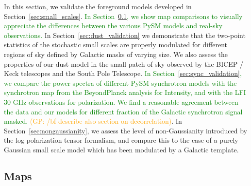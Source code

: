 \documentclass[twocolumn]{aastex631}
\newcommand{\giuse}[1]{\textcolor{orange}{(GP: #1)}}
\newcommand{\sg}[1]{\textcolor{teal}{(SG: #1)}}
\newcommand{\jd}[1]{\textcolor{green}{#1}}
\begin{document}
In this section, we validate the foreground models developed in Section~\ref{sec:small_scales}.
%
\jd{In Section~\ref{subsec:maps}, we show map comparisons to visually appreciate the differences between the various PySM models and real-sky observations.}
%
In Section~\ref{sec:dust_validation} we demonstrate that the two-point statistics of the stochastic small scales are properly modulated for different regions of sky defined by Galactic masks of varying size. We also assess the properties of our dust model in the small patch of sky observed by the BICEP / Keck telescopes and the South Pole Telescope.  
%
\jd{In Section~\ref{sec:sync_validation}, we compare the power spectra of different PySM synchrotron models with the synchrotron map from the BeyondPlanck analysis for Intensity, and with the LFI 30 GHz observations for polarization. We find a reasonable agreement between the data and our models for different fraction of the Galactic synchrotron signal masked.}
%
\giuse{/bf describe also section on decorrelation}. In Section~\ref{sec:nongaussianity}, we assess the level of non-Gaussianity introduced by the log polarization tensor formalism, and compare this to the case of a purely Gaussian small scale model which has been modulated by a Galactic template. 


\subsection{Maps}\label{subsec:maps}
\end{document}
